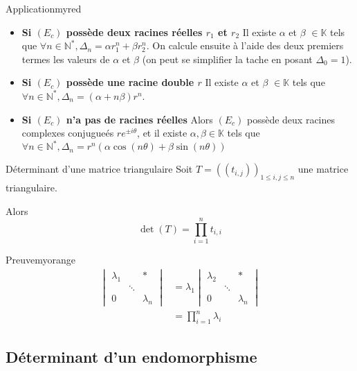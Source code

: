 \begin{omed}{Application}{myred}
\begin{itemize}
            \item \textbf{Si $(E_c)$ possède deux racines réelles $r_1$ et $r_2$} \quad Il existe $\alpha$ et $\beta$ $\in \mathbb{K}$ tels que $\forall n \in \mathbb{N}^*, \Delta_{n} = \alpha r_1^n + \beta r_2^n$. On calcule ensuite à l’aide des deux premiers termes les valeurs de $\alpha$ et $\beta$ (on peut se simplifier la tache en posant $\Delta_0 = 1$). 
            \item \textbf{Si $(E_c)$ possède une racine double $r$} \quad Il existe $\alpha$ et $\beta$ $\in \mathbb{K}$ tels que $\forall n \in \mathbb{N}^*, \Delta_n = (\alpha + n \beta) r^n$.
            \item \textbf{Si $(E_c)$ n’a pas de racines réelles} \quad Alors $(E_c)$ possède deux racines complexes conjugueés $r e^{\pm i \theta}$, et il existe $\alpha, \beta \in \mathbb{K}$ tels que $\forall n \in \mathbb{N}^*, \Delta_n = r^n \left(\alpha \cos(n\theta) + \beta \sin(n \theta)\right)$
        \end{itemize}
    \end{omed}

    \begin{coro}{Déterminant d’une matrice triangulaire}{}
        Soit $T = \left((t_{i,j})\right)_{1 \leq i,j \leq n}$ une matrice triangulaire.

        Alors \[ \det(T)=\prod_{i=1}^n t_{i,i} \]
    \end{coro}

    \begin{demo}{Preuve}{myorange}
        \begin{align*}
            \begin{vmatrix}
                \lambda_1 & & * \\
                & \ddots & \\
                0 & & \lambda_n
            \end{vmatrix} &= \lambda_1 \begin{vmatrix}
                \lambda_2 & & * \\
                & \ddots & \\
                0 & & \lambda_n
            \end{vmatrix} \\
            &= \prod_{i=1}^n \lambda_i
        \end{align*}
    \end{demo}

\subsection{Déterminant d’un endomorphisme}

